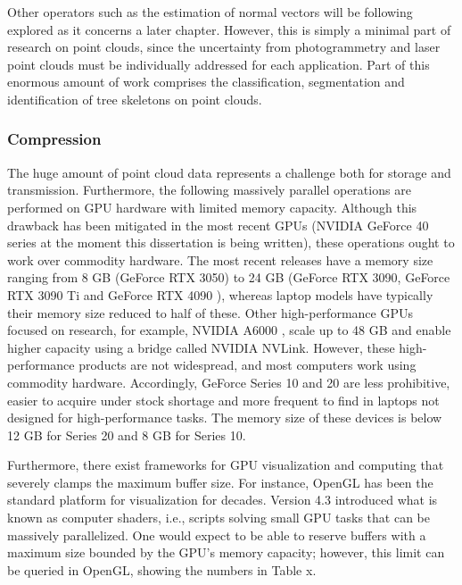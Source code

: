 Other operators such as the estimation of normal vectors will be following explored as it concerns a later chapter. However, this is simply a minimal part of research on point clouds, since the uncertainty from photogrammetry and laser point clouds must be individually addressed for each application. Part of this enormous amount of work comprises the classification, segmentation and identification of tree skeletons \cite{cardenas_reconstruction_2022} on point clouds. 

\subsubsection{Compression}

The huge amount of point cloud data represents a challenge both for storage and transmission. Furthermore, the following massively parallel operations are performed on GPU hardware with limited memory capacity. Although this drawback has been mitigated in the most recent GPUs (NVIDIA GeForce 40 series at the moment this dissertation is being written), these operations ought to work over commodity hardware. The most recent releases have a memory size ranging from 8 GB (GeForce RTX 3050) to 24 GB (GeForce RTX 3090, GeForce RTX 3090 Ti \cite{nvidia_nvidia_nodate-2} and GeForce RTX 4090 \cite{nvidia_nvidia_nodate-1}), whereas laptop models have typically their memory size reduced to half of these. Other high-performance GPUs focused on research, for example, NVIDIA A6000 \cite{nvidia_nvidia_nodate}, scale up to 48 GB and enable higher capacity using a bridge called NVIDIA NVLink. However, these high-performance products are not widespread, and most computers work using commodity hardware. Accordingly, GeForce Series 10 and 20 are less prohibitive, easier to acquire under stock shortage and more frequent to find in laptops not designed for high-performance tasks. The memory size of these devices is below 12 GB for Series 20 and 8 GB for Series 10. 

Furthermore, there exist frameworks for GPU visualization and computing that severely clamps the maximum buffer size. For instance, OpenGL has been the standard platform for visualization for decades. Version 4.3 introduced what is known as computer shaders, i.e., scripts solving small GPU tasks that can be massively parallelized. One would expect to be able to reserve buffers with a maximum size bounded by the GPU's memory capacity; however, this limit can be queried in OpenGL, showing the numbers in Table x.


